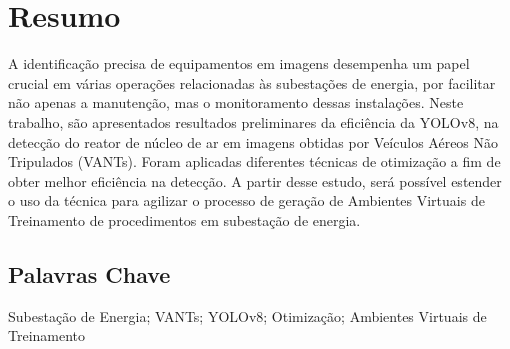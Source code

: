 \newpage
\thispagestyle{empty}
\chapter*{Resumo}
\vspace{-35pt}
A identificação precisa de equipamentos em imagens desempenha um papel crucial em várias operações relacionadas às subestações de energia, por facilitar não apenas a manutenção, mas o monitoramento dessas instalações. Neste trabalho, são apresentados resultados preliminares da eficiência da YOLOv8, na detecção do reator de núcleo de ar em imagens obtidas por Veículos Aéreos Não Tripulados (VANTs). Foram aplicadas diferentes técnicas de otimização a fim de obter melhor eficiência na detecção. A partir desse estudo, será possível estender o uso da técnica para agilizar o processo de geração de Ambientes Virtuais de Treinamento de procedimentos em subestação de energia.
\section*{Palavras Chave}
Subestação de Energia; VANTs; YOLOv8; Otimização; Ambientes Virtuais de Treinamento
\newpage

